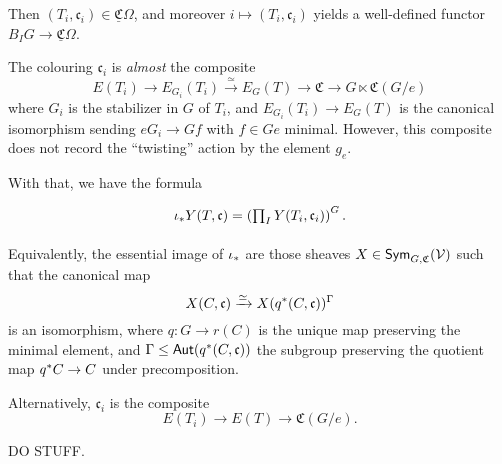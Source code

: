 \documentclass[a4paper,10pt
,draft
]{article}%
\newcommand{\UC}{\underline{\mathfrak C}}
\begin{document}
Then $(T_i, \mathfrak c_i) \in \UC\Omega$, and moreover
$i \mapsto (T_i, \mathfrak c_i)$ yields a well-defined functor $B_{I}G \to \UC\Omega$.


\begin{remark}
      The colouring $\mathfrak c_i$ is \textit{almost} the composite
      \begin{equation}
            E(T_i) \to E_{G_i}(T_i) \xrightarrow{\simeq} E_G(T) \to \mathfrak C \to G \ltimes \mathfrak C(G/e)
      \end{equation}
      where $G_i$ is the stabilizer in $G$ of $T_i$, and
      $E_{G_i}(T_i) \to E_G(T)$ is the canonical isomorphism sending
      $e{G_i} \to Gf$
      with $f \in Ge$ minimal.
      However, this composite does not record the ``twisting'' action by the element $g_e$.
\end{remark}


With that, we have the formula
\begin{equation}
      \begin{tikzcd}
            \iota_{\**}Y(T,\mathfrak c) =
            \left(
                  \prod_I Y(T_i, \mathfrak c_i)
            \right)^G.
      \end{tikzcd}
\end{equation}

\begin{remark}[{cf. \cite[Rem 4.35]{BP17}}]
      Equivalently, the essential image of $\iota_{\**}$ are those sheaves $X \in \mathsf{Sym}_{G, \mathfrak C}(\mathcal V)$ such that
      the canonical map
      \begin{equation}
            X(C,\mathfrak c) \xrightarrow{\simeq} X(q^{\**}(C, \mathfrak c))^\Gamma
      \end{equation}
      is an isomorphism, where $q: G \to r(C)$ is the unique map preserving the minimal element, and
      $\Gamma \leq \mathsf{Aut}(q^{\**}(C,\mathfrak c))$ the subgroup preserving the quotient map $q^{\**}C \to C$
      under precomposition.
\end{remark}

\begin{remark}
      Alternatively, $\mathfrak c_i$ is the composite
      \begin{equation}
            E(T_i) \to E(T) \to \mathfrak C(G/e).
      \end{equation}
\end{remark}



DO STUFF.
\end{document}
